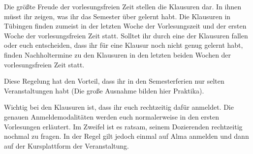 
Die größte Freude der vorlesungsfreien Zeit stellen die Klausuren dar. In ihnen
müsst ihr zeigen, was ihr das Semester über gelernt habt. Die Klausuren in
Tübingen finden zumeist in der letzten Woche der Vorlesungszeit und der ersten
Woche der vorlesungsfreien Zeit statt. Solltet ihr durch eine der Klausuren
fallen oder euch entscheiden, dass ihr für eine Klausur noch nicht genug
gelernt habt, finden Nachholtermine zu den Klausuren in den letzten beiden
Wochen der vorlesungsfreien Zeit statt.

Diese Regelung hat den Vorteil, dass ihr in den Semesterferien nur selten
Veranstaltungen habt (Die große Ausnahme bilden hier Praktika).

Wichtig bei den Klausuren ist, dass ihr euch rechtzeitig dafür anmeldet. Die
genauen Anmeldemodalitäten werden euch normalerweise in den ersten Vorlesungen
erläutert. Im Zweifel ist es ratsam, seinem Dozierenden rechtzeitig nochmal zu
fragen. In der Regel gilt jedoch einmal auf Alma anmelden und dann auf der 
Kursplattform der Veranstaltung.
